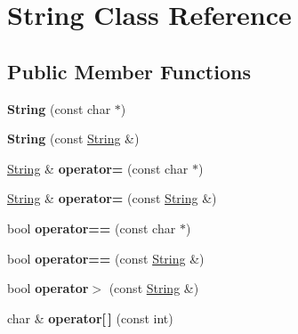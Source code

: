 \hypertarget{classString}{}\section{String Class Reference}
\label{classString}
\subsection*{Public Member Functions}
\begin{DoxyCompactItemize}
\item 
{\bfseries String} (const char $\ast$)\hypertarget{classString_ad39c697bdbac27d33d03e7eed00a6473}{}\label{classString_ad39c697bdbac27d33d03e7eed00a6473}

\item 
{\bfseries String} (const \hyperlink{classString}{String} \&)\hypertarget{classString_a6b411ab9c0631fe02c7b9c483a022bb8}{}\label{classString_a6b411ab9c0631fe02c7b9c483a022bb8}

\item 
\hyperlink{classString}{String} \& {\bfseries operator=} (const char $\ast$)\hypertarget{classString_a596a0530156ee6c3c15a1555c5434883}{}\label{classString_a596a0530156ee6c3c15a1555c5434883}

\item 
\hyperlink{classString}{String} \& {\bfseries operator=} (const \hyperlink{classString}{String} \&)\hypertarget{classString_a9569887dd75996bd707c1ad9130c8b39}{}\label{classString_a9569887dd75996bd707c1ad9130c8b39}

\item 
bool {\bfseries operator==} (const char $\ast$)\hypertarget{classString_aeb3a7de4951210d7becbc74d11ce6a73}{}\label{classString_aeb3a7de4951210d7becbc74d11ce6a73}

\item 
bool {\bfseries operator==} (const \hyperlink{classString}{String} \&)\hypertarget{classString_a237e08041d73a0382cf8b40419717b8d}{}\label{classString_a237e08041d73a0382cf8b40419717b8d}

\item 
bool {\bfseries operator$>$} (const \hyperlink{classString}{String} \&)\hypertarget{classString_a9e08050cb4c0442faeccf1c174e41c0f}{}\label{classString_a9e08050cb4c0442faeccf1c174e41c0f}

\item 
char \& {\bfseries operator\mbox{[}$\,$\mbox{]}} (const int)\hypertarget{classString_a1497f26dbd15e54d07bcbece446fe84f}{}\label{classString_a1497f26dbd15e54d07bcbece446fe84f}


\end{DoxyCompactItemize}
